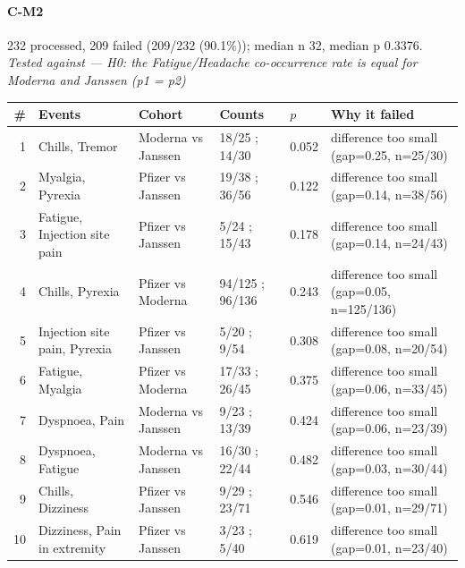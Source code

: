 \documentclass[11pt]{article}
\begin{document}
\paragraph{C-M2} 232 processed, 209 failed (209/232 (90.1\%)); median n 32, median p 0.3376. \emph{Tested against --- H0: the Fatigue/Headache co-occurrence rate is equal for Moderna and Janssen (p1 = p2)} \\
\begin{longtable}{@{}r p{3.9cm} p{2.5cm} l l p{4.4cm}@{}}
\toprule
\# & Events & Cohort & Counts & $p$ & Why it failed \\
\midrule \endhead
1 & Chills, Tremor & Moderna vs Janssen & 18/25 ; 14/30 & 0.052 & difference too small (gap=0.25, n=25/30) \\
2 & Myalgia, Pyrexia & Pfizer vs Janssen & 19/38 ; 36/56 & 0.122 & difference too small (gap=0.14, n=38/56) \\
3 & Fatigue, Injection site pain & Pfizer vs Janssen & 5/24 ; 15/43 & 0.178 & difference too small (gap=0.14, n=24/43) \\
4 & Chills, Pyrexia & Pfizer vs Moderna & 94/125 ; 96/136 & 0.243 & difference too small (gap=0.05, n=125/136) \\
5 & Injection site pain, Pyrexia & Pfizer vs Janssen & 5/20 ; 9/54 & 0.308 & difference too small (gap=0.08, n=20/54) \\
6 & Fatigue, Myalgia & Pfizer vs Moderna & 17/33 ; 26/45 & 0.375 & difference too small (gap=0.06, n=33/45) \\
7 & Dyspnoea, Pain & Moderna vs Janssen & 9/23 ; 13/39 & 0.424 & difference too small (gap=0.06, n=23/39) \\
8 & Dyspnoea, Fatigue & Moderna vs Janssen & 16/30 ; 22/44 & 0.482 & difference too small (gap=0.03, n=30/44) \\
9 & Chills, Dizziness & Pfizer vs Janssen & 9/29 ; 23/71 & 0.546 & difference too small (gap=0.01, n=29/71) \\
10 & Dizziness, Pain in extremity & Pfizer vs Janssen & 3/23 ; 5/40 & 0.619 & difference too small (gap=0.01, n=23/40) \\
\bottomrule
\end{longtable}
\end{document}
